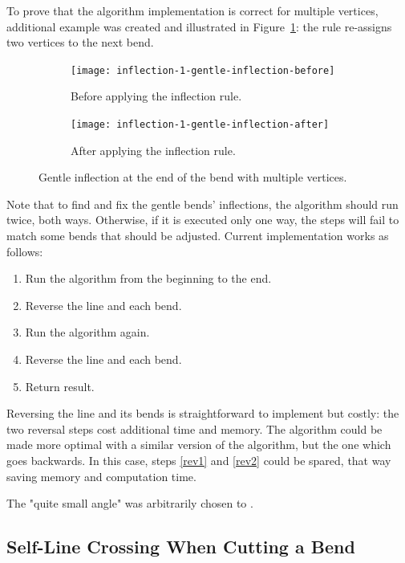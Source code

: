\documentclass[a4paper]{article}
\begin{document}
To prove that the algorithm implementation is correct for multiple vertices,
additional example was created and illustrated in
Figure~\ref{fig:inflection-1-gentle-inflection}: the rule re-assigns two
vertices to the next bend.

\begin{figure}[ht]
    \centering
    \begin{subfigure}[b]{.49\textwidth}
        \texttt{[image: inflection-1-gentle-inflection-before]}
        \caption{Before applying the inflection rule.}
    \end{subfigure}
    \hfill
    \begin{subfigure}[b]{.49\textwidth}
        \texttt{[image: inflection-1-gentle-inflection-after]}
        \caption{After applying the inflection rule.}
    \end{subfigure}
    \caption{Gentle inflection at the end of the bend with multiple vertices.}
    \label{fig:inflection-1-gentle-inflection}
\end{figure}

Note that to find and fix the gentle bends' inflections, the algorithm should
run twice, both ways. Otherwise, if it is executed only one way, the steps will
fail to match some bends that should be adjusted. Current implementation works
as follows:

\begin{enumerate}
    \item Run the algorithm from the beginning to the end.
    \item \label{rev1} Reverse the line and each bend.
    \item Run the algorithm again.
    \item \label{rev2} Reverse the line and each bend.
    \item Return result.
\end{enumerate}

Reversing the line and its bends is straightforward to implement but costly:
the two reversal steps cost additional time and memory. The algorithm could be
made more optimal with a similar version of the algorithm, but the one which
goes backwards. In this case, steps \ref{rev1} and \ref{rev2} could be spared,
that way saving memory and computation time.

The "quite small angle" was arbitrarily chosen to \smallAngle.

\subsection{Self-Line Crossing When Cutting a Bend}
\end{document}
